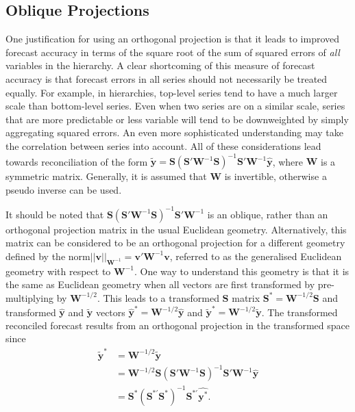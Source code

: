 \documentclass[12pt]{article}
\theoremstyle{definition}
\begin{document}
\subsection{Oblique Projections}\label{sec:oblique}

One justification for using an orthogonal projection is that it leads to improved forecast accuracy in terms of the square root of the sum of squared errors of \emph{all} variables in the hierarchy. A clear shortcoming of this measure of forecast accuracy is that forecast errors in all series should not necessarily be treated equally. For example, in hierarchies, top-level series tend to have a much larger scale than bottom-level series. Even when two series are on a similar scale, series that are more predictable or less variable will tend to be downweighted by simply aggregating squared errors. An even more sophisticated understanding may take the correlation between series into account. All of these considerations lead towards reconciliation of the form $\tilde{\bm{y}}=\bm{S}(\bm{S}'\bm{W}^{-1}\bm{S})^{-1}\bm{S}'\bm{W}^{-1}\hat{\bm{y}}$, where $\bm{W}$ is a symmetric matrix. Generally, it is assumed that $\bm{W}$ is invertible, otherwise a pseudo inverse can be used.

It should be noted that $\bm{S}(\bm{S}'\bm{W}^{-1}\bm{S})^{-1}\bm{S}'\bm{W}^{-1}$ is an oblique, rather than an orthogonal projection matrix in the usual Euclidean geometry. {\color{blue}Alternatively,} this matrix can be considered to be an orthogonal projection for a different geometry defined by the norm\break $||\bm{v}||_{\bm{W}^{-1}}=\bm{v}'\bm{W}^{-1}\bm{v}$, referred to as the generalised Euclidean geometry with respect to $\bm{W}^{-1}$. One way to understand this geometry is that it is the same as Euclidean geometry when all vectors are first transformed by pre-multiplying by $\bm{W}^{-1/2}$. This leads to a transformed $\bm{S}$ matrix $\bm{S}^*=\bm{W}^{-1/2}\bm{S}$ and transformed $\hat{\bm{y}}$ and $\tilde{\bm{y}}$ vectors $\hat{\bm{y}}^*=\bm{W}^{-1/2}\hat{\bm{y}}$ and $\tilde{\bm{y}}^*=\bm{W}^{-1/2}\tilde{\bm{y}}$. The transformed reconciled forecast results from an orthogonal projection in the transformed space since
\begin{align*}
  \tilde{\bm{y}}^*
    & = \bm{W}^{-1/2}\tilde{\bm{y}} \\
    & = \bm{W}^{-1/2}\bm{S}(\bm{S}'\bm{W}^{-1}\bm{S})^{-1}\bm{S}'\bm{W}^{-1}\hat{\bm{y}} \\
    & = \bm{S}^*(\bm{S}^{*'}\bm{S}^*)^{-1}\bm{S}^{*'}\hat{\bm{y}^*}.
\end{align*}
\end{document}
